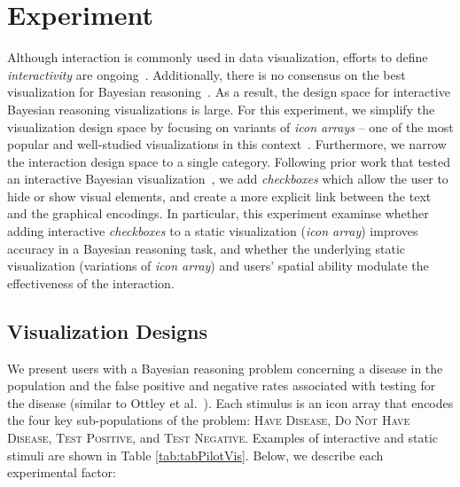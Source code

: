 
\section{Experiment}
Although interaction is commonly used in data visualization, efforts to define \textit{interactivity} are ongoing~\cite{dimara2020What}. Additionally, there is no consensus on the best visualization for Bayesian reasoning~\cite{micallef2012Assessing, khan2015Benefits, ottley2016Bayesian}. As a result, the design space for interactive Bayesian reasoning visualizations is large. 
For this experiment, we simplify the visualization design space by focusing on variants of \textit{icon arrays} -- one of the most popular and well-studied visualizations in this context~\cite{micallef2012Assessing,ottley2016Bayesian,ottley2019Curious}. Furthermore, we narrow the interaction design space to a single category. Following prior work that tested an interactive Bayesian visualization~\cite{tsai2011Interactive}, we add \textit{checkboxes} which allow the user to hide or show visual elements, and create a more explicit link between the text and the graphical encodings. In particular, this experiment examinse whether adding interactive \textit{checkboxes} to a static visualization (\textit{icon array}) improves accuracy in a Bayesian reasoning task, and whether the underlying static visualization (variations of \textit{icon array}) and users' spatial ability modulate the effectiveness of the interaction. %

\subsection{Visualization Designs}
We present users with a Bayesian reasoning problem concerning a disease in the population and the false positive and negative rates associated with testing for the disease (similar to Ottley et al.~\cite{ottley2016Bayesian}). Each stimulus is an icon array that encodes the four key sub-populations of the problem: \textsc{Have Disease}, \textsc{Do Not Have Disease}, \textsc{Test Positive}, and \textsc{Test Negative}. 
Examples of interactive and static stimuli are shown in Table \ref{tab:tabPilotVis}. Below, we describe each experimental factor: 

